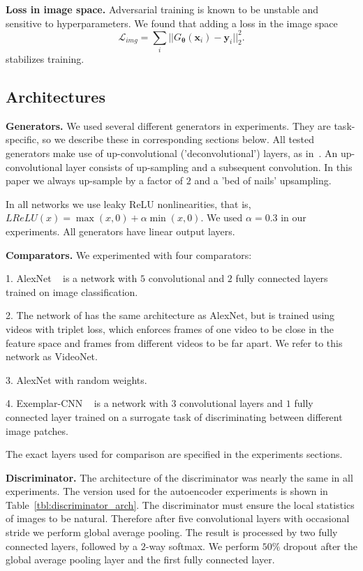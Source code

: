 \documentclass{article}
\newcommand{\inp}{\mathbf{x}}
\newcommand{\targ}{\mathbf{y}}
\newcommand{\weights}{\mathbf{\theta}}
\newcommand{\gen}{G_\weights}
\newcommand{\loss}{\mathcal{L}}
\newcommand{\pixloss}{\loss_{img}}
\begin{document}
\textbf{Loss in image space.}
Adversarial training is known to be unstable and sensitive to hyperparameters.
We found that adding a loss in the image space
\begin{equation}
 \pixloss = \sum\limits_{i} || \gen(\inp_i) - \targ_i ||_2^2.
\end{equation}
stabilizes training.

\subsection{Architectures}

\textbf{Generators.} 
We used several different generators in experiments. 
They are task-specific, so we describe these in corresponding sections below.
All tested generators make use of up-convolutional ('deconvolutional') layers, as in~\citet{Dosovitskiy_CVPR2015}.
An up-convolutional layer consists of up-sampling and a subsequent convolution.
In this paper we always up-sample by a factor of $2$ and a 'bed of nails' upsampling.

In all networks we use leaky ReLU nonlinearities, that is, $LReLU(x) = \max(x,0) + \alpha \min(x,0)$.
We used $\alpha = 0.3$ in our experiments.
All generators have linear output layers.

\textbf{Comparators.}
We experimented with four comparators:

1. AlexNet ~\citep{Krizhevsky_NIPS2012} is a network with $5$ convolutional and $2$ fully connected layers trained on image classification.

2. The network of \citet{Wang_ICCV2015} has the same architecture as AlexNet, but is trained using videos with triplet loss, which enforces frames of one video to be close in the feature space and frames from different videos to be far apart. We refer to this network as VideoNet.

3. AlexNet with random weights.

4. Exemplar-CNN ~\citep{Exemplar_PAMI2015} is a network with $3$ convolutional layers and $1$ fully connected layer trained on a surrogate task of discriminating between different image patches.

The exact layers used for comparison are specified in the experiments sections.

\textbf{Discriminator.} The architecture of the discriminator was nearly the same in all experiments.
The version used for the autoencoder experiments is shown in Table~\ref{tbl:discriminator_arch}.
The discriminator must ensure the local statistics of images to be natural.
Therefore after five convolutional layers with occasional stride we perform global average pooling.
The result is processed by two fully connected layers, followed by a $2$-way softmax.
We perform $50 \%$ dropout after the global average pooling layer and the first fully connected layer.
\end{document}
